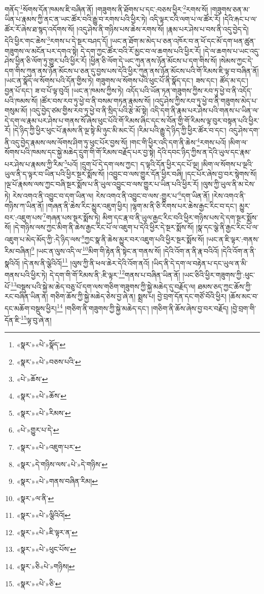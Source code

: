 གནོད་\footnote{«སྣར་»«པེ་»སྣོད་}སོགས་དོན་ཁམས་ཇི་བཞིན་ནོ། །གཟུགས་ནི་ཐོགས་པ་དང་:བཅས་ཕྱིར་\footnote{«སྣར་»«པེ་»བཅས་པའི་}རགས་སོ། །གཟུགས་ཅན་མ་ཡིན་པ་རྣམས་ཀྱི་ནང་ན་ཡང་ཚོར་བའི་རྒྱུ་བ་རགས་པའི་ཕྱིར་ཏེ། འདི་ལྟར་ངའི་ལག་པ་ལ་ཚོར་རོ། །དེའི་རྐང་པ་ལ་ཚོར་རོ་ཞེས་ཐ་སྙད་འདོགས་སོ། །འདུ་ཤེས་ནི་གཉིས་པས་ཆེས་རགས་སོ། །རྣམ་པར་ཤེས་པ་བས་ནི་འདུ་བྱེད་དེ། དེའི་ཕྱིར་གང་ཆེས་\footnote{«པེ་»ཆོས་}རགས་པ་དེ་སྔར་བཤད་དོ། །ཡང་ན་ཐོག་མ་མེད་པ་ཅན་འཁོར་བ་ན་ཕོ་དང་མོ་དག་ཕན་ཚུན་གཟུགས་ལ་མངོན་པར་དགའ་སྟེ། དེ་དག་ཀྱང་ཚོར་བའི་རོ་མྱང་བ་ལ་ཆགས་པའི་ཕྱིར་རོ། །དེ་ལ་ཆགས་པ་ཡང་འདུ་ཤེས་ཕྱིན་ཅི་ལོག་ཏུ་གྱུར་པའི་ཕྱིར་རོ། །ཕྱིན་ཅི་ལོག་དེ་ཡང་ཀུན་ནས་ཉོན་མོངས་པ་དག་གིས་སོ། །སེམས་ཀྱང་དེ་དག་གིས་ཀུན་ནས་ཉོན་མོངས་པ་ཅན་དུ་བྱས་པས་དེའི་ཕྱིར་ཀུན་ནས་ཉོན་མོངས་པའི་གོ་རིམས་ཇི་ལྟ་བ་བཞིན་ནོ། །ཡང་ན་སྣོད་ལ་སོགས་པའི་དོན་གྱིས་ཏེ། གཟུགས་ལ་སོགས་པའི་ཕུང་པོ་ནི་སྣོད་དང་། ཟས་དང་། ཚོད་མ་དང་། བྱན་པོ་དང་། ཟ་བ་པོ་ལྟ་བུའོ། །ཡང་ན་ཁམས་ཀྱིས་ཏེ། འདོད་པའི་ཡོན་ཏན་གཟུགས་ཀྱིས་རབ་ཏུ་ཕྱེ་བ་ནི་འདོད་པའི་ཁམས་སོ། །ཚོར་བས་རབ་ཏུ་ཕྱེ་བ་ནི་བསམ་གཏན་རྣམས་སོ། །འདུ་ཤེས་ཀྱིས་རབ་ཏུ་ཕྱེ་བ་ནི་གཟུགས་མེད་པ་གསུམ་མོ། །འདུ་བྱེད་ཙམ་གྱིས་རབ་ཏུ་ཕྱེ་བ་ནི་སྲིད་པའི་རྩེ་མོ་སྟེ། འདི་དག་ནི་རྣམ་པར་ཤེས་པའི་གནས་པ་ཡིན་ལ་དེ་དག་ལ་རྣམ་པར་ཤེས་པ་གནས་སོ་ཞེས་ཕུང་པོའི་གོ་རིམས་ཞིང་དང་ས་བོན་གྱི་གོ་རིམས་ལྟ་བུར་བསྟན་པའི་ཕྱིར་རོ། །དེ་ཉིད་ཀྱི་ཕྱིར་ཕུང་པོ་རྣམས་ནི་ལྔ་སྟེ་མི་ཉུང་མི་མང་ངོ། །རིམ་པའི་རྒྱུ་དེ་ཉིད་ཀྱི་ཕྱིར་ཚོར་བ་དང་། འདུ་ཤེས་དག་ནི་འདུ་བྱེད་རྣམས་ལས་ལོགས་ཤིག་ཏུ་ཕུང་པོར་བྱས་སོ། །གང་གི་ཕྱིར་འདི་དག་ནི་ཆེས་\footnote{«སྣར་»«པེ་»ཆོས་}རགས་པའོ། །མིག་ལ་སོགས་པའི་ཁམས་དང་སྐྱེ་མཆེད་དྲུག་གི་གོ་རིམས་བརྗོད་པར་བྱ་སྟེ། དེའི་དབང་ཉིད་ཀྱིས་ན་དེའི་ཡུལ་དང་རྣམ་པར་ཤེས་པ་རྣམས་ཀྱི་རིམ་\footnote{«སྣར་»«པེ་»རིམས་}པའོ། །དྲུག་པོ་དེ་དག་ལས་ཀྱང་། ད་ལྟའི་དོན་ཕྱིར་དང་པོ་ལྔ། །མིག་ལ་སོགས་པ་ལྔའི་ཡུལ་ནི་ད་ལྟར་བ་ཡིན་པའི་ཕྱིར་སྔར་སྨོས་སོ། །འབྱུང་བ་ལས་གྱུར་དོན་ཕྱིར་བཞི། །དང་པོར་ཞེས་བྱ་བར་སྙེགས་སོ། །ལྔ་པོ་རྣམས་ལས་ཀྱང་བཞི་སྔར་སྨོས་པ་ནི་ཡུལ་འབྱུང་བ་ལས་གྱུར་པ་ཡིན་པའི་ཕྱིར་རོ། །ལུས་ཀྱི་ཡུལ་ནི་མ་ངེས་ཏེ། རེས་འགའ་ནི་འབྱུང་བ་དག་ཡིན་ལ། རེས་འགའ་ནི་འབྱུང་བ་ལས་:གྱུར་པ་\footnote{«པེ་»གྱུར་པ་དེ་}དག་ཡིན་ནོ། །རེས་འགའ་ནི་གཉིས་ཀ་ཡིན་ནོ། །གཞན་ནི་ཆེས་རིང་མྱུར་འཇུག་ཕྱིར། །ལྷག་མ་ནི་ཅི་རིགས་པར་ཆེས་རྒྱང་རིང་བ་དང་། མྱུར་བར་:འཇུག་པས་\footnote{«སྣར་»«པེ་»འཇུག་པར་}གཞན་པས་སྔར་སྨོས་ཏེ། མིག་དང་རྣ་བ་ནི་ཡུལ་རྒྱང་རིང་བའི་ཕྱིར་གཉིས་པས་དེ་དག་སྔར་སྨོས་སོ། །དེ་གཉིས་ལས་ཀྱང་མིག་ནི་ཆེས་རྒྱང་རིང་པོ་ལ་འཇུག་པ་དེའི་ཕྱིར་དེ་སྔར་སྨོས་སོ། །སྣ་དང་ལྕེ་ནི་རྒྱང་རིང་པོ་ལ་འཇུག་པ་མེད་མོད་ཀྱི་:དེ་ཉིད་ལས་\footnote{«སྣར་»དེ་གཉིས་ལས་«པེ་»དེ་གཉིས་}ཀྱང་སྣ་ནི་ཆེས་མྱུར་བར་འཇུག་པའི་ཕྱིར་སྔར་སྨོས་སོ། །ཡང་ན་ཇི་ལྟར་:གནས་རིམ་བཞིན།\footnote{«སྣར་»«པེ་»གནས་བཞིན་རིམ།} །ཡང་ན་ལུས་འདི་ལ་\footnote{«སྣར་»ལ་ནི་}མིག་གི་རྟེན་ནི་སྟེང་ན་གནས་སོ། །དེའི་འོག་ན་ནི་རྣ་བའིའོ། །དེའི་འོག་ན་ནི་སྣའིའོ། །དེ་ནས་ནི་ལྕེའིའོ།\footnote{«སྣར་»«པེ་»ལྕིའིའོ།} །ལུས་ཀྱི་ནི་ཕལ་ཆེར་དེའི་འོག་ནའོ། །ཡིད་ནི་དེ་དག་ལ་བརྟེན་པ་དང་ཡུལ་ན་མི་གནས་པའི་ཕྱིར་ཏེ། དེ་དག་གི་གོ་རིམས་ནི་:ཇི་ལྟར་\footnote{«སྣར་»«པེ་»ཇི་ལྟར་ན་}གནས་པ་བཞིན་ཡིན་ནོ། །ཡང་ཅིའི་ཕྱིར་གཟུགས་ཀྱི་:ཕུང་པོ་\footnote{«སྣར་»«པེ་»ཕུང་པོས་}བསྡུས་པའི་སྐྱེ་མ་ཆེད་བཅུ་པོ་དག་ལས་གཅིག་གཟུགས་ཀྱི་སྐྱེ་མཆེད་དུ་བརྗོད་ལ། ཐམས་ཅད་ཀྱང་ཆོས་ཀྱི་རང་བཞིན་ཡིན་ན། གཅིག་ཆོས་ཀྱི་སྐྱེ་མཆེད་ཅེས་བྱ་ཞེ་ན། སྨྲས་པ། བྱེ་བྲག་དོན་དང་གཙོ་བོའི་ཕྱིར། །ཆོས་མང་བ་དང་མཆོག་བསྡུས་ཕྱིར།\footnote{«སྣར་»ཅི«པེ་»གཉིས།} །གཅིག་ནི་གཟུགས་ཀྱི་སྐྱེ་མཆེད་དང་། །གཅིག་ནི་ཆོས་ཞེས་བྱ་བར་བརྗོད། །བྱེ་བྲག་གི་དོན་ཇི་\footnote{«སྣར་»«པེ་»ཅི་}ལྟ་བུ་ཞེ་ན། 